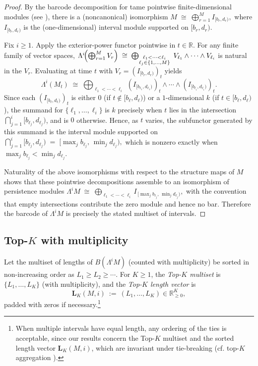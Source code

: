 \documentclass[runningheads]{llncs}
\newcommand{\R}{\mathbb{R}}
\newcommand{\B}{B}
\newcommand{\Lam}{\Lambda}
\begin{document}
\begin{proof}
By the barcode decomposition for tame pointwise finite-dimensional modules
(see \cite{Oudot15,ChazalStructure16}), there is a (noncanonical) isomorphism
$M \;\cong\; \bigoplus_{r=1}^M I_{[b_r,d_r)},$ 
where $I_{[b_r,d_r)}$ is the (one-dimensional) interval module supported on
$[b_r,d_r)$.

Fix $i\ge 1$. Apply the exterior-power functor pointwise in $t\in\R$.
For any finite family of vector spaces, $\Lam^i\!\Bigl(\bigoplus_{r=1}^M V_r\Bigr)
\;\cong\;
\bigoplus_{\substack{\ell_1<\cdots<\ell_i\\ \ell_j\in\{1,\dots,M\}}}
\; V_{\ell_1}\wedge\cdots\wedge V_{\ell_i}$
is natural in the $V_r$. Evaluating at time $t$ with $V_r=(I_{[b_r,d_r)})_t$ yields
\[
\Lam^i(M_t)
\;\cong\;
\bigoplus_{\ell_1<\cdots<\ell_i}
\; (I_{[b_{\ell_1},d_{\ell_1})})_t \wedge \cdots \wedge (I_{[b_{\ell_i},d_{\ell_i})})_t .
\]
Since each $(I_{[b_\ell,d_\ell)})_t$ is either $0$ (if $t\notin[b_\ell,d_\ell)$) or a
$1$-dimensional $k$ (if $t\in[b_\ell,d_\ell)$), the summand for
$\{\ell_1,\dots,\ell_i\}$ is $k$ precisely when $t$ lies in the intersection
$\bigcap_{j=1}^i [b_{\ell_j},d_{\ell_j})$, and is $0$ otherwise. Hence, as $t$
varies, the subfunctor generated by this summand is the interval module supported on
$\bigcap_{j=1}^i [b_{\ell_j},d_{\ell_j})
\;=\;
\bigl[\max_j b_{\ell_j},\,\min_j d_{\ell_j}\bigr),$ 
which is nonzero exactly when $\max_j b_{\ell_j}<\min_j d_{\ell_j}$.

Naturality of the above isomorphisms with respect to the structure maps of
$M$ shows that these pointwise decompositions assemble to an isomorphism of
persistence modules
$\Lam^i M
\;\cong\;
\bigoplus_{\ell_1<\cdots<\ell_i}
I_{\,[\max_j b_{\ell_j},\,\min_j d_{\ell_j})},$ 
with the convention that empty intersections contribute the zero module and
hence no bar. Therefore the barcode of $\Lam^i M$ is precisely the stated
multiset of intervals.
\end{proof}



\subsection{Top-$K$ with multiplicity}\label{sec:topk-mult}
Let the multiset of lengths of $\B(\Lam^i M)$ (counted with multiplicity) 
be sorted in non-increasing order as $L_1\ge L_2\ge\cdots$. For $K\ge 1$, the
\emph{Top-$K$ multiset} is $\{L_1,\dots,L_K\}$ (with multiplicity), and the
\emph{Top-$K$ length vector} is
\[
\mathbf L_K(M,i)\ :=\ (L_1,\dots,L_K)\in\mathbb{R}_{\ge 0}^K,
\]
padded with zeros if necessary.\footnote{When multiple intervals have equal length, any ordering of the ties is acceptable, since our results concern the Top-$K$ multiset and the sorted length vector $\mathbf L_K(M,i)$, which are invariant under tie-breaking (cf. top-$K$ aggregation \cite{Fagin03}).}
\end{document}
